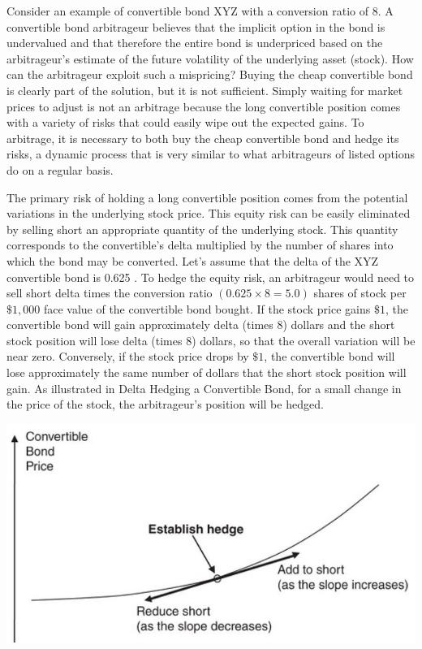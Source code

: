 \documentclass[11pt]{article}
\begin{document}
Consider an example of convertible bond XYZ with a conversion ratio of 8. A convertible bond arbitrageur believes that the implicit option in the bond is undervalued and that therefore the entire bond is underpriced based on the arbitrageur's estimate of the future volatility of the underlying asset (stock). How can the arbitrageur exploit such a mispricing? Buying the cheap convertible bond is clearly part of the solution, but it is not sufficient. Simply waiting for market prices to adjust is not an arbitrage because the long convertible position comes with a variety of risks that could easily wipe out the expected gains. To arbitrage, it is necessary to both buy the cheap convertible bond and hedge its risks, a dynamic process that is very similar to what arbitrageurs of listed options do on a regular basis.

The primary risk of holding a long convertible position comes from the potential variations in the underlying stock price. This equity risk can be easily eliminated by selling short an appropriate quantity of the underlying stock. This quantity corresponds to the convertible's delta multiplied by the number of shares into which the bond may be converted. Let's assume that the delta of the XYZ convertible bond is 0.625 . To hedge the equity risk, an arbitrageur would need to sell short delta times the conversion ratio $(0.625 \times 8=5.0)$ shares of stock per $\$ 1,000$ face value of the convertible bond bought. If the stock price gains $\$ 1$, the convertible bond will gain approximately delta (times 8) dollars and the short stock position will lose delta (times 8) dollars, so that the overall variation will be near zero. Conversely, if the stock price drops by $\$ 1$, the convertible bond will lose approximately the same number of dollars that the short stock position will gain. As illustrated in Delta Hedging a Convertible Bond, for a small change in the price of the stock, the arbitrageur's position will be hedged.

\begin{center}
\includegraphics[max width=\textwidth]{2024_04_09_d2bdb6aa136bcf7c7f5eg-06}
\end{center}
\end{document}
